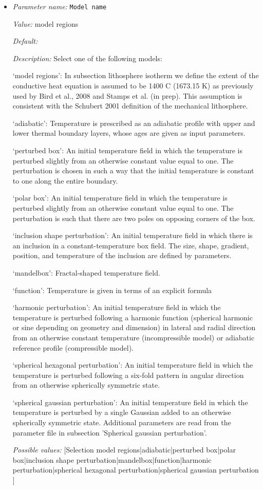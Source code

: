 \begin{itemize}
\item {\it Parameter name:} {\tt Model name}


{\it Value:} model regions


{\it Default:} 


{\it Description:} Select one of the following models:

`model regions': In subsection lithosphere isotherm we define the extent of the conductive heat equation is assumed to be 1400 C (1673.15 K) as previously used by Bird et al., 2008 and Stamps et al. (in prep). This assumption is consistent with the Schubert 2001 definition of the mechanical lithosphere.

`adiabatic': Temperature is prescribed as an adiabatic profile with upper and lower thermal boundary layers, whose ages are given as input parameters.

`perturbed box': An initial temperature field in which the temperature is perturbed slightly from an otherwise constant value equal to one. The perturbation is chosen in such a way that the initial temperature is constant to one along the entire boundary.

`polar box': An initial temperature field in which the temperature is perturbed slightly from an otherwise constant value equal to one. The perturbation is such that there are two poles on opposing corners of the box. 

`inclusion shape perturbation': An initial temperature field in which there is an inclusion in a constant-temperature box field. The size, shape, gradient, position, and temperature of the inclusion are defined by parameters.

`mandelbox': Fractal-shaped temperature field.

`function': Temperature is given in terms of an explicit formula

`harmonic perturbation': An initial temperature field in which the temperature is perturbed following a harmonic function (spherical harmonic or sine depending on geometry and dimension) in lateral and radial direction from an otherwise constant temperature (incompressible model) or adiabatic reference profile (compressible model).

`spherical hexagonal perturbation': An initial temperature field in which the temperature is perturbed following a six-fold pattern in angular direction from an otherwise spherically symmetric state.

`spherical gaussian perturbation': An initial temperature field in which the temperature is perturbed by a single Gaussian added to an otherwise spherically symmetric state. Additional parameters are read from the parameter file in subsection 'Spherical gaussian perturbation'.


{\it Possible values:} [Selection model regions|adiabatic|perturbed box|polar box|inclusion shape perturbation|mandelbox|function|harmonic perturbation|spherical hexagonal perturbation|spherical gaussian perturbation ]
\end{itemize}



